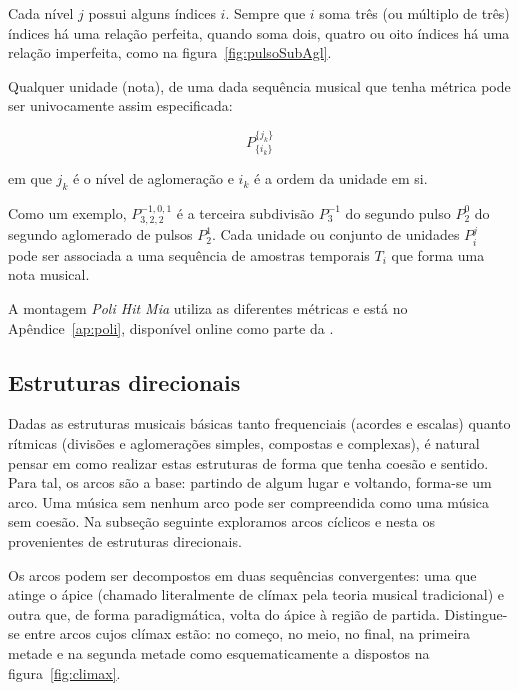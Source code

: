 Cada nível $j$ possui alguns índices $i$. Sempre que $i$ soma três 
(ou múltiplo de três) índices há uma relação perfeita, 
quando soma dois, quatro ou oito índices há uma relação imperfeita, como na figura~\ref{fig:pulsoSubAgl}.


Qualquer unidade (nota), de uma
dada sequência musical que tenha métrica pode ser
univocamente assim especificada:

\begin{equation}
P^{ \{ j_k \} }_{ \{ i_{k} \}}
\end{equation}

em que $j_k$ é o nível de aglomeração e $i_k$ é a ordem
da unidade em si.

Como um exemplo, $P^{-1,0,1}_{3,2,2}$  é a terceira subdivisão $P^{-1}_3$ do segundo
pulso $P^0_2$ do segundo aglomerado de pulsos $P^1_2$.
Cada unidade ou conjunto de unidades $P_i^j$ pode ser associada a uma sequência de amostras temporais $T_i$ que forma uma nota musical. 

A montagem \emph{Poli Hit Mia} utiliza as diferentes métricas e está no Apêndice~\ref{ap:poli}, disponível online como parte da \massa.

\subsection{Estruturas direcionais}\label{subsec:dir}

Dadas as estruturas musicais básicas tanto frequenciais (acordes e escalas) quanto 
rítmicas (divisões e aglomerações simples, compostas e complexas), é 
natural pensar em como realizar estas estruturas de forma que tenha coesão e sentido.\cite{Boulez}
Para tal, os arcos são a base: partindo de algum lugar e voltando, forma-se um arco. Uma música sem nenhum arco pode ser compreendida como uma música sem coesão.
Na subseção seguinte exploramos arcos cíclicos e nesta
os provenientes de estruturas direcionais.

Os arcos podem ser decompostos em duas sequências convergentes: 
uma que atinge o ápice (chamado literalmente de clímax pela teoria musical tradicional) e 
outra que, de forma paradigmática, volta do ápice à região de partida. Distingue-se entre arcos cujos clímax estão: no começo, no meio, no final, na primeira metade e na segunda metade como esquematicamente a dispostos na figura~\ref{fig:climax}.\cite{Schoenberg}

